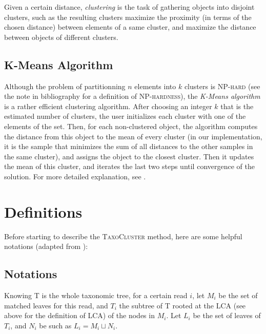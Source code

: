 \documentclass{report}
\begin{document}
Given a certain distance, \emph{clustering} is the task of gathering objects into disjoint clusters, such as the resulting clusters maximize the proximity (in terms of the chosen distance) between elements of a same cluster, and maximize the distance between objects of different clusters.

\subsection{K-Means Algorithm} 

Although the problem of partitionning $n$ elements into $k$ clusters \cite{PartitionIsNPhard} is \textsc{NP-hard}\cite{NPhard} (see the note in bibliography for a definition of \textsc{NP-hardness}), the \emph{K-Means algorithm} \cite{KMeans} is a rather efficient clustering algorithm. After choosing an integer $k$ that is the estimated number of clusters, the user initializes each cluster with one of the elements of the set. Then, for each non-clustered object, the algorithm computes the distance from this object to the mean of every cluster (in our implementation, it is the sample that minimizes the sum of all distances to the other samples in the same cluster), and assigns the object to the closest cluster. Then it updates the mean of this cluster, and iterates the last two steps until convergence of the solution. For more detailed explanation, see \cite{KMeans}.

\section{Definitions}

Before starting to describe the \textsc{TaxoCluster} method, here are some helpful notations (adapted from \cite{Tango1}):\\

\subsection{Notations}

Knowing \textsc{T} is the whole taxonomic tree, for a certain read $i$, let $M_{i}$ be the set of matched leaves for this read, and $T_{i}$ the subtree of \textsc{T} rooted at the \textsc{LCA} (see above for the definition of \textsc{LCA}) of the nodes in $M_{i}$. Let $L_{i}$ be the set of leaves of $T_{i}$, and $N_{i}$ be such as $L_{i} = M_{i} \sqcup N_{i}$.
\end{document}
